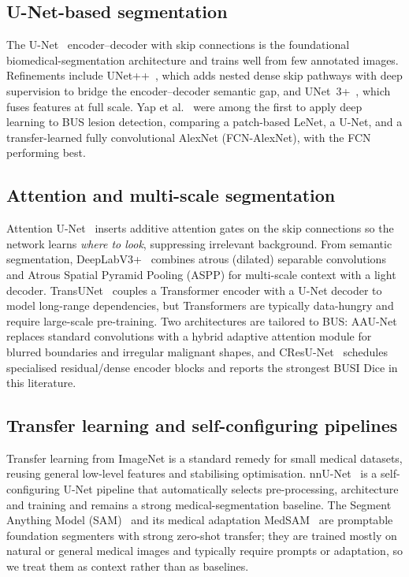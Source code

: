 \documentclass[11pt]{article}
\begin{document}
\subsection{U-Net-based segmentation}
The U-Net~\cite{ronneberger2015unet} encoder--decoder with skip connections is
the foundational biomedical-segmentation architecture and trains well from few
annotated images. Refinements include UNet++~\cite{zhou2018unetpp}, which adds
nested dense skip pathways with deep supervision to bridge the encoder--decoder
semantic gap, and UNet~3+~\cite{huang2020unet3plus}, which fuses features at full
scale. Yap et al.~\cite{yap2018cnn} were among the first to apply deep learning
to BUS lesion detection, comparing a patch-based LeNet, a U-Net, and a
transfer-learned fully convolutional AlexNet (FCN-AlexNet), with the FCN
performing best.

\subsection{Attention and multi-scale segmentation}
Attention U-Net~\cite{oktay2018attentionunet} inserts additive attention gates on
the skip connections so the network learns \emph{where to look}, suppressing
irrelevant background. From semantic segmentation, DeepLabV3+~\cite{chen2018deeplabv3plus}
combines atrous (dilated) separable convolutions and Atrous Spatial Pyramid
Pooling (ASPP) for multi-scale context with a light decoder. TransUNet~\cite{chen2021transunet}
couples a Transformer encoder with a U-Net decoder to model long-range
dependencies, but Transformers are typically data-hungry and require large-scale
pre-training. Two architectures are tailored to BUS: AAU-Net~\cite{chen2023aaunet}
replaces standard convolutions with a hybrid adaptive attention module for
blurred boundaries and irregular malignant shapes, and CResU-Net~\cite{derakhshandeh2024cresunet}
schedules specialised residual/dense encoder blocks and reports the strongest
BUSI Dice in this literature.

\subsection{Transfer learning and self-configuring pipelines}
Transfer learning from ImageNet is a standard remedy for small medical datasets,
reusing general low-level features and stabilising optimisation. nnU-Net~\cite{isensee2021nnunet}
is a self-configuring U-Net pipeline that automatically selects pre-processing,
architecture and training and remains a strong medical-segmentation baseline. The
Segment Anything Model (SAM)~\cite{kirillov2023sam} and its medical adaptation
MedSAM~\cite{ma2024medsam} are promptable foundation segmenters with strong
zero-shot transfer; they are trained mostly on natural or general medical images
and typically require prompts or adaptation, so we treat them as context rather
than as baselines.
\end{document}
